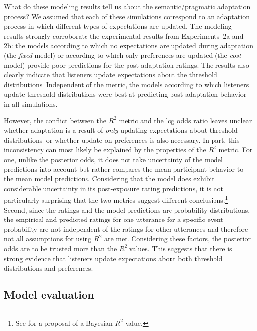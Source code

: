 \documentclass[man, floatsintext]{apa6}
\begin{document}
What do these modeling results tell us about the semantic/pragmatic adaptation process? 
We assumed that each of these simulations
correspond to an adaptation process in which different types of expectations are  updated.
The modeling results strongly corroborate the experimental results from Experiments~2a and 2b:
the models according to which no expectations are updated during adaptation (the \textit{fixed} model) 
or according to which only preferences are updated (the \textit{cost} model) provide poor predictions for the post-adaptation
ratings. The results also clearly indicate that listeners update expectations about the threshold distributions. Independent of
the metric, the models according to which listeners update threshold distributions were best at predicting post-adaptation
behavior in all simulations. 

However, the conflict between the $R^2$ metric and the log odds ratio leaves unclear whether adaptation is a result of \emph{only} updating expectations about threshold distributions, or whether update on preferences is also necessary. 
In part, this inconsistency can most likely be explained by the properties of the $R^2$ metric. For one, unlike the posterior odds, 
it does not take uncertainty of the model predictions into account but rather compares the mean participant behavior to the mean 
model predictions. Considering that the model does exhibit considerable uncertainty in its post-exposure rating predictions, it is not
particularly surprising that the two metrics suggest different conclusions.\footnote{See \textcite{Gelman2019} for a proposal of a Bayesian $R^2$ value.}
Second, since the ratings and the model predictions are probability distributions, 
the empirical and predicted ratings for one utterance for a specific event probability are not independent 
of the ratings for other utterances and therefore not all assumptions for using $R^2$ are met. Considering these
factors, the posterior odds are to be trusted more than the $R^2$ values. This suggests that there is strong evidence that listeners 
update expectations about both {threshold distributions} and {preferences}. 



\subsection{Model evaluation}
\end{document}

